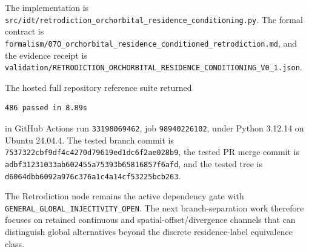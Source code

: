 The implementation is \texttt{src/idt/retrodiction\_orchorbital\_residence\_conditioning.py}. The formal contract is \texttt{formalism/07O\_orchorbital\_residence\_conditioned\_retrodiction.md}, and the evidence receipt is \texttt{validation/RETRODICTION\_ORCHORBITAL\_RESIDENCE\_CONDITIONING\_V0\_1.json}.

The hosted full repository reference suite returned
\begin{verbatim}
486 passed in 8.89s
\end{verbatim}
in GitHub Actions run \texttt{33198069462}, job \texttt{98940226102}, under Python 3.12.14 on Ubuntu 24.04.4. The tested branch commit is \texttt{7537322cbf9df4c4270d79619ed1dc6f2ae028b9}, the tested PR merge commit is \texttt{adbf31231033ab602455a75393b65816857f6afd}, and the tested tree is \texttt{d6064dbb6092a976c376a1c4a14cf53225bcb263}.

The Retrodiction node remains the active dependency gate with \texttt{GENERAL\_GLOBAL\_INJECTIVITY\_OPEN}. The next branch-separation work therefore focuses on retained continuous and spatial-offset/divergence channels that can distinguish global alternatives beyond the discrete residence-label equivalence class.
